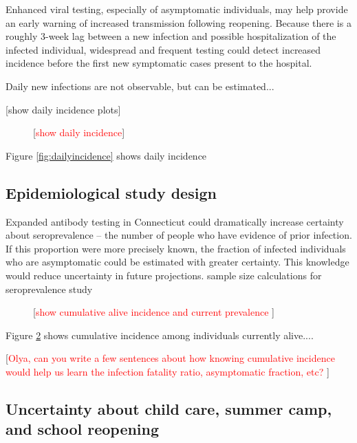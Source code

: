 \documentclass[11pt]{article}
\newcommand{\comment}[1]{[\textcolor{red}{#1}]}
\begin{document}
Enhanced viral testing, especially of asymptomatic individuals, may help provide an early warning of increased transmission following reopening.  Because there is a roughly 3-week lag between a new infection and possible hospitalization of the infected individual, widespread and frequent testing could detect increased incidence before the first new symptomatic cases present to the hospital. 

Daily new infections are not observable, but can be estimated...



[show daily incidence plots]


\begin{figure}
\centering
\caption{\comment{show daily incidence}}
\label{fig:dailyncidence}
\end{figure}

Figure \ref{fig:dailyincidence} shows daily incidence 



\subsection*{Epidemiological study design}

Expanded antibody testing in Connecticut could dramatically increase certainty about seroprevalence -- the number of people who have evidence of prior infection. If this proportion were more precisely known, the fraction of infected individuals who are asymptomatic could be estimated with greater certainty.  This knowledge would reduce uncertainty in future projections.  
sample size calculations for seroprevalence study


\begin{figure}
\centering
\caption{\comment{show cumulative alive incidence and current prevalence }}
\label{fig:cumincidence}
\end{figure}

Figure \ref{fig:cumincidence} shows cumulative incidence among individuals currently alive....


\comment{Olya, can you write a few sentences about how knowing cumulative incidence would help us learn the infection fatality ratio, asymptomatic fraction, etc? }



\subsection*{Uncertainty about child care, summer camp, and school reopening}
\end{document}
